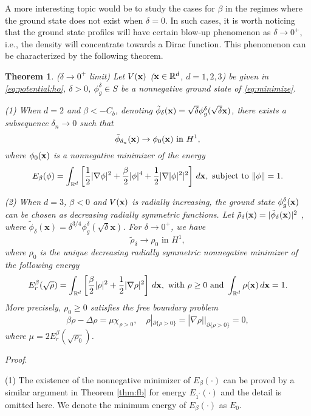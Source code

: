 \documentclass{elsarticle}
\newcommand{\be}{\begin{equation}}
\newcommand{\ee}{\end{equation}}
\newtheorem{theorem}{Theorem}[section]
\newcommand{\bx}{{\bf x} }
\newcommand{\tphi}{{\tilde{\phi}} }
\newcommand{\trho}{{\tilde{\rho}} }
\begin{document}
A more interesting topic would be to study the cases for $\beta$ in the regimes where
the ground state does not exist when $\delta=0$.
In such cases, it is worth noticing that the ground state profiles will
have certain blow-up phenomenon  as $\delta\to0^+$, i.e., the density will concentrate towards a Dirac function.
This phenomenon can be characterized by the following theorem.
\begin{theorem}\label{thm:delta}($\delta\to0^+$ limit)
Let $V(\bx)$ ($\bx\in\Bbb R^d$, $d=1,2,3$) be given in \eqref{eq:potential:ho}, $\delta>0$, $\phi_g^\delta\in S$ be a nonnegative ground state of \eqref{eq:minimize}.

(1) When $d=2$ and $\beta<-C_b$, denoting $\tphi_{\delta}(\bx)=\sqrt{\delta}\phi_g^{\delta}(\sqrt{\delta}\mathbf{x})$, there exists a subsequence %
$\delta_n\to0$ such that
\be
\tphi_{\delta_n}(\bx)\to\phi_0(\bx) \text{ in } H^1,
\ee
where
 $\phi_0(\bx)$ is a  nonnegative minimizer of the energy
\be\label{eq:energybeta}
E_{\rm \beta}(\phi)=\int_{\Bbb R^d}\left[\frac{1}{2}|\nabla\phi|^2+\frac{\beta}{2}|\phi|^4+\frac{1}{2}|\nabla|\phi|^2|^2\right]\,d\bx, \text{ subject to  } \|\phi\|=1.
\ee


(2) When $d=3$, $\beta<0$ and $V(\bx)$ is radially  increasing, %
 the ground state  $\phi_g^\delta(\bx)$ can be chosen
 as  decreasing radially symmetric functions.  Let $\trho_{\delta}(\mathbf{x})=|\tphi_\delta(\bx)|^2$ , where $\tphi_{\delta}(\mathbf{x})=\delta^{3/4}\phi_g^{\delta}(\sqrt{\delta}\mathbf{x})$. For $\delta\to0^+$, we have
\be
\trho_{\delta}\to\rho_0 \text{ in } H^1,
\ee
where $\rho_0$ is the unique decreasing radially symmetric nonnegative minimizer
of the following energy
\be
E_r^{\beta}(\sqrt{\rho})=\int_{\Bbb R^d}\left[\frac{\beta}{2}|\rho|^2+\frac{1}{2}|\nabla\rho|^2\right]\,d\bx,\text{ with } \rho\ge0 \text{ and }  \int_{\Bbb R^d}\rho(\bx)\,d\bx=1.
\ee
More precisely, $\rho_{0}\ge0$ satisfies the free boundary problem
\be
\beta\rho-\Delta\rho=\mu\chi_{\rho>0}, \quad \rho|_{\partial\{\rho>0\}}=|\nabla\rho|\big|_{\partial\{\rho>0\}}=0,
\ee
where $\mu=2E_r^\beta(\sqrt{\rho_0})$.
\end{theorem}
{\noindent\it Proof}.

(1) The existence of the nonnegative minimizer of $E_\beta(\cdot)$ can be proved by a similar argument in Theorem \ref{thm:fb} for energy $E_{1^\prime}(\cdot)$ and the detail is omitted here. We denote the minimum energy of $E_\beta(\cdot)$ as $E_0$.
\end{document}
